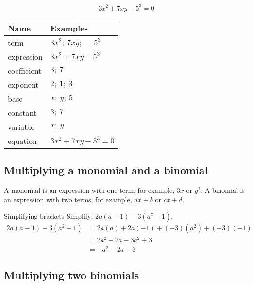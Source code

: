 \begin{equation*}
3x^2 + 7xy - 5^3 = 0
\end{equation*}



\begin{table}[H]
\begin{center}
\begin{tabular}{|l|l|}
\hline
\textbf{Name} & \textbf{Examples} \\
\hline
term & $3x^2;~7xy;~-5^3$\\ \hline
expression & $3x^2 + 7xy -5^3$\\ \hline
coefficient & $3;~7$\\ \hline
exponent & $2;~1;~3$\\ \hline
base & $x;~y;~5$\\ \hline
constant & $3;~7$\\ \hline
variable & $x;~y$\\ \hline
equation & $3x^2 + 7xy -5^3 = 0$\\ \hline


\end{tabular}
\end{center}
\end{table} 

\par

\subsection*{Multiplying a monomial and a binomial}

A monomial is an expression with one term, for example, $3x$ or $y^2$.
A binomial is an expression with two terms, for example,
$ax+b$ or $cx+d$.

\begin{wex}{Simplifying brackets}
{Simplify: $2a(a-1) - 3(a^{2}-1)$.}
{
\begin{align*}
  2a(a-1) -3(a^{2}-1) &= 2a(a) + 2a(-1) + (-3)(a^{2})+(-3)(-1) \\
  &= 2a^{2} - 2a - 3a^{2} + 3 \\
  &= -a^{2} -2a + 3
\end{align*}
}
\end{wex}

\subsection*{Multiplying two binomials}

